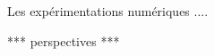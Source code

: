 \documentclass[preprint,12pt,authoryear]{elsarticle}
\begin{document}
Les expérimentations numériques .... %

*** perspectives ***
\color{black}

%
%
\end{document}
